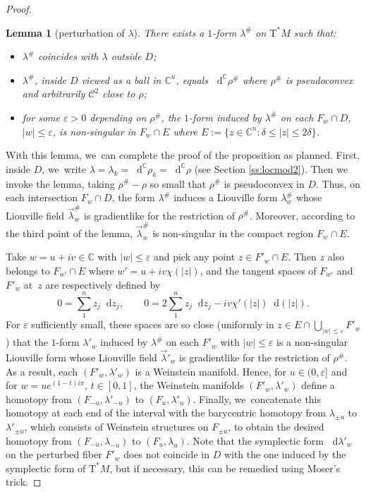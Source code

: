 \documentclass[10pt]{amsart}
\newcommand{\C}{{\mathbb C}}
\newcommand{\cC}{{\mathcal{C}}}
\newcommand{\tu}[1]{\textup{#1}}
\newcommand{\sT}{\mathrm{T}^\ast}
\renewcommand{\d}{\mathop{}\!\mathrm d}
\newcommand{\dc}{\d^{\scriptscriptstyle{\C}}}
\newcommand{\dlambda}{\d\lambda}
\newcommand{\dz}{\d z}
\newcommand{\de}{\mathrel{:=}}
\newcommand{\with}{\mathrel{:}}
\let\eps\varepsilon
\theoremstyle{plain}
\newtheorem{lemma}[theorem]{Lemma}
\theoremstyle{definition}
\begin{document}
\begin{proof}
\begin{lemma}[perturbation of $\lambda$] \label{l:sharp}
There exists a $1$-form $\lambda^\#$ on $\sT M$ such that\tu:
\begin{itemize}
\item
$\lambda^\#$ coincides with $\lambda$ outside $D$;
\item
$\lambda^\#$, inside $D$ viewed as a ball in $\C^n$, equals $\dc\rho^\#$ where
$\rho^\#$ is pseudoconvex and arbitrarily $\cC^2$ close to $\rho$\tu;
\item
for some $\eps>0$ depending on $\rho^\#$, the $1$-form induced by $\lambda^\#$
on each $F_w \cap D$, $|w| \le \eps$, is non-singular in $F_w \cap E$ where $E
\de \{z \in \C^n \with \delta \le |z| \le 2\delta\}$.
\end{itemize}
\end{lemma}

With this lemma, we~can complete the proof of the proposition as planned. First,
inside $D$, we~write $\lambda = \lambda_k = \dc\rho_k = \dc\rho$ (see Section
\ref{ss:locmod2}). Then we invoke the lemma, taking $\rho^\# - \rho$ so small
that $\rho^\#$ is pseudoconvex in $D$. Thus, on each intersection $F_w \cap D$,
the form $\lambda^\#$ induces a Liouville form $\lambda^\#_w$ whose Liouville
field $\vec\lambda^\#_w$ is gradientlike for the restriction of $\rho^\#$.
Moreover, according to the third point of the lemma, $\vec\lambda^\#_w$ is
non-singular in the compact region $F_w \cap E$.

Take $w = u+iv \in \C$ with $|w| \le \eps$ and pick any point $z \in F'_w \cap
E$. Then $z$ also belongs to $F_{w'} \cap E$ where $w' = u + iv \chi(|z|)$, and
the tangent spaces of $F_{w'}$ and $F'_w$ at~$z$ are respectively defined by
\[
 0 = \sum_1^n z_j \dz_j, \qquad
 0 = 2 \sum_1^n z_j \dz_j - iv \chi'(|z|) \d(|z|).
\]
For $\eps$ sufficiently small, these spaces are so close (uniformly in $z \in E
\cap \bigcup_{|w| \le \eps} F'_w$) that the $1$-form $\lambda'_w$ induced by
$\lambda^\#$ on each $F'_w$ with $|w| \le \eps$ is a non-singular Liouville
form whose Liouville field $\vec\lambda'_w$ is gradientlike for the restriction
of $\rho^\#$. As a result, each $(F'_w, \lambda'_w)$ is a Weinstein manifold.
Hence, for $u \in (0,\eps]$ and for $w = u e^{(1-t)i\pi}$, $t \in [0,1]$, the
Weinstein manifolds $(F'_w, \lambda'_w)$ define a homotopy from $(F_{-u},
\lambda'_{-u})$ to $(F_u, \lambda'_u)$. Finally, we~concatenate this homotopy at
each end of the interval with the barycentric homotopy from $\lambda_{\pm u}$ to
$\lambda'_{\pm u}$, which consists of Weinstein structures on $F_{\pm u}$, to
obtain the desired homotopy from $(F_{-u}, \lambda_{-u})$ to $(F_u, \lambda_u)$.
Note that the symplectic form $\dlambda'_w$ on the perturbed fiber $F'_w$ does
not coincide in $D$ with the one induced by the symplectic form of $\sT M$, but
if necessary, this can be remedied using Moser's trick.
\end{proof}
\end{document}
